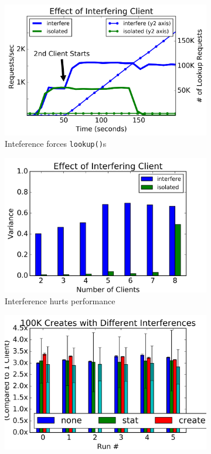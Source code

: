\begin{figure}[t]
  \centering
  \begin{subfigure}[b]{.3\linewidth}
      \centering
      \includegraphics[width=1.0\linewidth]{graphs/behavior-interfere.png}
      \caption{Inteference forces \texttt{lookup()}s}
      \label{fig:interfere-a}
  \end{subfigure}
  \begin{subfigure}[b]{.3\linewidth}
      \centering
      \includegraphics[width=1.0\linewidth]{graphs/slowdown-interfere.png}
      \caption{Interference hurts performance}
      \label{fig:interfere-b}
  \end{subfigure}
  \begin{subfigure}[b]{.3\linewidth}
      \centering
      \includegraphics[width=1.0\linewidth]{graphs/slowdown-interfere-types.png}

\end{subfigure}
\end{figure}
